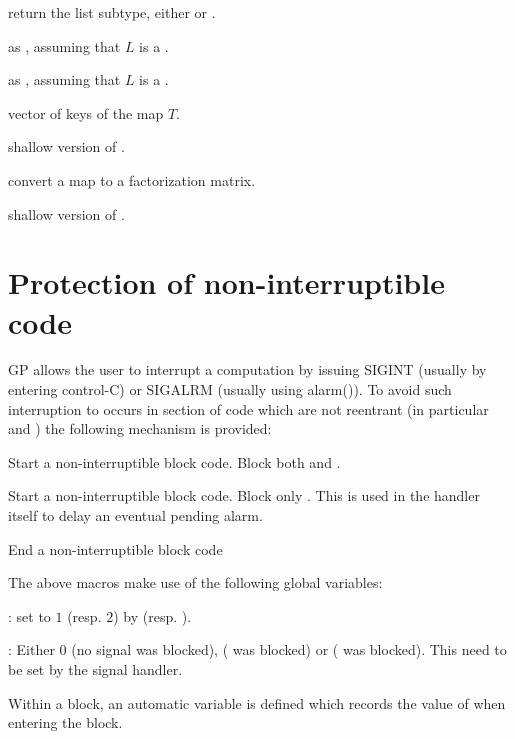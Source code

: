  return the list subtype, either  or
.

 as ,
assuming that $L$ is a .

 as ,
assuming that $L$ is a .

 vector of keys of the map $T$.

 shallow version of .

 convert a map to a factorization matrix.

 shallow version of .

\section{Protection of non-interruptible code}

GP allows the user to interrupt a computation by issuing SIGINT
(usually by entering control-C) or SIGALRM (usually using alarm()).
To avoid such interruption to occurs in section of code which are not
reentrant (in particular  and )
the following mechanism is provided:

  Start a non-interruptible block code. Block both  and .

  Start a non-interruptible block code. Block only .
This is used in the  handler itself to delay an eventual pending
alarm.

  End a non-interruptible block code

The above macros make use of the following global variables:

: set to $1$ (resp. $2$) by 
(resp. ).

: Either $0$ (no signal was blocked), 
( was blocked) or  ( was blocked).
This need to be set by the signal handler.

Within a block, an automatic variable  is defined which
records the value of  when entering the block.


